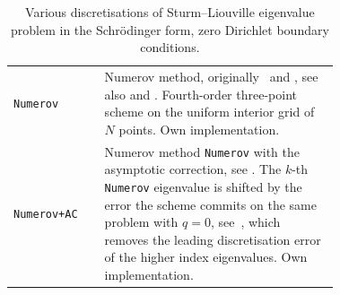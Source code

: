 \begin{table}
\begin{tabular}{l p{0.72\linewidth}}
    \midrule
    \texttt{Numerov} & Numerov method, originally~\cite{noumerov.bv:method} and \cite{numerov.b:note}, see also \cite{hairer.e.nrsett.sp.ea:solving} and \cite{andrew.al:asymptotic}. Fourth-order three-point scheme on the uniform interior grid of $N$ points. Own implementation. \\
    \texttt{Numerov+AC} & Numerov method \texttt{Numerov} with the asymptotic correction, see \cite{andrew.al:asymptotic}. The $k$-th \texttt{Numerov} eigenvalue is shifted by the error the scheme commits on the same problem with $q = 0$, see~\cite{paine.jw.hoog.fr.ea:on}, which removes the leading discretisation error of the higher index eigenvalues. Own implementation. \\
    \bottomrule
  \end{tabular}
  \caption{Various discretisations of Sturm--Liouville eigenvalue problem in the Schr\"odinger form, zero Dirichlet boundary conditions.}
  \label{tab:methods_description_line}
\end{table}
